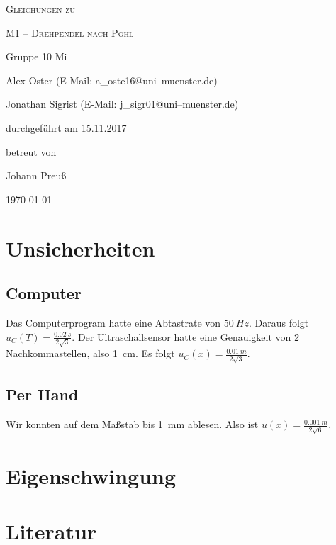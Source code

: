 \documentclass[11pt,a4paper,titlepage, ngerman]{article}
\begin{document}
	\begin{titlepage}
		
		\centering
		{\scshape\LARGE Gleichungen zu \par}
		\vspace{1cm}
		{\scshape\huge M1 -- Drehpendel nach Pohl\par}
		\vspace{2.5cm}
		{\LARGE Gruppe 10 Mi\par}
		\vspace{0.5cm}
		{\large Alex Oster (E-Mail: a\_oste16@uni--muenster.de) \par}
		{\large Jonathan Sigrist (E-Mail: j\_sigr01@uni--muenster.de) \par}
		\vfill
		durchgeführt am 15.11.2017\par
		betreut von\par
		{\large Johann Preuß}		
		\vfill	
		{\large \today\par}
		
	\end{titlepage}
		
	\tableofcontents
		
	\newpage
	
	\section{Unsicherheiten}
	
	\subsection*{Computer}
	Das Computerprogram hatte eine Abtastrate von $\SI{50}{Hz}$. Daraus folgt $u_C(T) = \frac{\SI{0,02}{s}}{2\sqrt{3}}$.
	Der Ultraschallsensor hatte eine Genauigkeit von 2 Nachkommastellen, also \SI{1}{cm}. Es folgt $u_C(x) = \frac{\SI{0,01}{m}}{2\sqrt{3}}$.
	
	\subsection*{Per Hand}
	Wir konnten auf dem Maßstab bis \SI{1}{mm} ablesen. Also ist $u(x) = \frac{\SI{0,001}{m}}{2\sqrt{6}}$.
	
	\section{Eigenschwingung}

	\newpage			
	\section*{Literatur}
\end{document}
